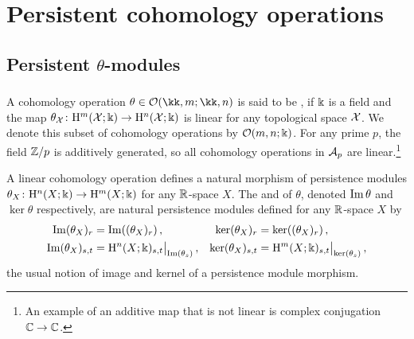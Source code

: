 
\section{Persistent cohomology operations}\label{s:steenrod}





\subsection{Persistent $\theta$-modules}

\subsubsection{}

A cohomology operation $\theta \in \cO(\kk,m; \kk,n)$ is said to be , if $\Bbbk$ is a field and the map $\theta_{\mathcal{X}} \colon \mathrm{H}^m(\mathcal{X}; \Bbbk) \to \mathrm{H}^n(\mathcal{X}; \Bbbk)$ is linear for any topological space $\mathcal{X}$.
We denote this subset of cohomology operations by $\mathcal{O}(m,n;\Bbbk)$.
For any prime $p$, the field $\mathbb{Z}/p$ is additively generated, so all cohomology operations in $\mathcal{A}_p$ are linear.\footnote{An example of an additive map that is not linear is complex conjugation $\mathbb{C} \to \mathbb{C}$.}

A linear cohomology operation defines a natural morphism of persistence modules $\theta_X \colon \mathrm{H}^n(X; \Bbbk) \to \mathrm{H}^m(X; \Bbbk)$ for any $\mathbb{R}$-space $X$.
The  and  of $\theta$, denoted $\operatorname{Im}\theta$ and $\ker\theta$ respectively, are natural persistence modules defined for any $\mathbb{R}$-space $X$ by
\begin{align*}
	\operatorname{Im}(\theta_X)_r &= \operatorname{Im}((\theta_X)_r)\,, &
	\ker(\theta_X)_r &= \ker((\theta_X)_r)\,, \\
	\operatorname{Im}(\theta_X)_{s,t} &= \mathrm{H}^n(X;\Bbbk)_{s,t}\big|_{\operatorname{Im}(\theta_s)}\,, &
	\ker(\theta_X)_{s,t} &= \mathrm{H}^m(X;\Bbbk)_{s,t}\big|_{\ker(\theta_s)}\,,
\end{align*}
the usual notion of image and kernel of a persistence module morphism.

